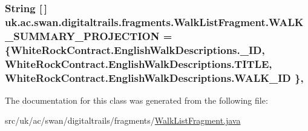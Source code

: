 \hypertarget{classuk_1_1ac_1_1swan_1_1digitaltrails_1_1fragments_1_1_walk_list_fragment_a457173fbe4c810b68c502aa91dab8960}{
\subsubsection[{W\+A\+L\+K\+\_\+\+S\+U\+M\+M\+A\+R\+Y\+\_\+\+P\+R\+O\+J\+E\+C\+T\+I\+O\+N}]{\setlength{\rightskip}{0pt plus 5cm}String \mbox{[}$\,$\mbox{]} uk.\+ac.\+swan.\+digitaltrails.\+fragments.\+Walk\+List\+Fragment.\+W\+A\+L\+K\+\_\+\+S\+U\+M\+M\+A\+R\+Y\+\_\+\+P\+R\+O\+J\+E\+C\+T\+I\+O\+N = \{White\+Rock\+Contract.\+English\+Walk\+Descriptions.\+\_\+\+I\+D, White\+Rock\+Contract.\+English\+Walk\+Descriptions.\+T\+I\+T\+L\+E, White\+Rock\+Contract.\+English\+Walk\+Descriptions.\+W\+A\+L\+K\+\_\+\+I\+D \}\hspace{0.3cm}{\ttfamily [static]}, {\ttfamily [protected]}}}\label{classuk_1_1ac_1_1swan_1_1digitaltrails_1_1fragments_1_1_walk_list_fragment_a457173fbe4c810b68c502aa91dab8960}


The documentation for this class was generated from the following file\+:\begin{DoxyCompactItemize}
\item 
src/uk/ac/swan/digitaltrails/fragments/\hyperlink{_walk_list_fragment_8java}{Walk\+List\+Fragment.\+java}\end{DoxyCompactItemize}
